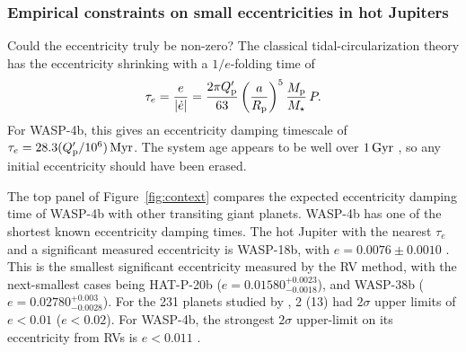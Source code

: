 \documentclass[12pt,twocolumn,tighten]{aastex62}
\begin{document}
\subsubsection{Empirical constraints on small eccentricities in hot
Jupiters}

Could the eccentricity truly be non-zero?  The classical
tidal-circularization theory has the eccentricity shrinking with a
$1/e$-folding time of \citep[{\it e.g.}, Equation~1
of][]{dobbs-dixon_spin-orbit_2004}
\begin{equation}
  \tau_e
  = \frac{e}{|\dot{e}|}
  = \frac{2\pi Q_{\rm p}'}{63}
  \left( \frac{a}{R_{\rm p}} \right)^5
  \frac{M_{\rm p}}{M_\star}\, P .
\end{equation}
For WASP-4b, this gives an eccentricity damping timescale of $\tau_e =
28.3 (Q_{\rm p}'/10^6) \, {\rm Myr}$.  The system age appears to be
well over $1\,{\rm Gyr}$ \citep{winn_transit_2009}, so any initial
eccentricity should have been erased.

The top panel of Figure~\ref{fig:context} compares the expected
eccentricity damping time of WASP-4b with other transiting giant
planets.  WASP-4b has one of the shortest known eccentricity damping
times.  The hot Jupiter with the nearest $\tau_e$ and a significant
measured eccentricity is WASP-18b, with $e = 0.0076 \pm 0.0010$
\citep{triaud_spin-orbit_2010,bonomo_gaps_2017}.  This is the smallest
significant eccentricity measured by the RV method, with the
next-smallest cases being HAT-P-20b ($e =
0.01580^{+0.0023}_{-0.0018}$), and WASP-38b ($e =
0.02780^{+0.003}_{-0.0028}$).  For the 231 planets studied by
\citet{bonomo_gaps_2017}, 2 (13) had $2\sigma$ upper limits of $e <
0.01$ ($e<0.02$).  For WASP-4b, the strongest $2\sigma$ upper-limit on
its eccentricity from RVs is $e<0.011$
\citep{husnoo_observational_2012,bonomo_gaps_2017}.  
\end{document}
